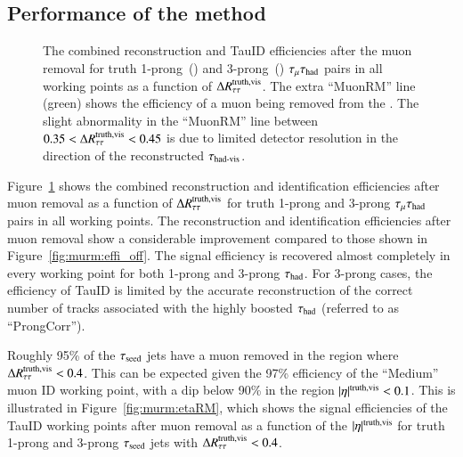     \subsection{Performance of the method} \label{sec:murm_perf}
        \begin{figure}[hbtp]
            \begin{center}
                \caption{The combined reconstruction and TauID efficiencies 
                    after the muon removal for truth 1-prong~(\protect{})
                    and 3-prong~(\protect{}) 
                    $\tau_\mathrm{\mu}\tau_\mathrm{had}$ pairs in all working points as a function of $\Delta R^\mathrm{truth, vis}_\mathrm{\tau\tau}$. 
                    The extra ``MuonRM'' line (green) shows the efficiency of a muon 
                    being removed from the \tauseed. The slight abnormality in the ``MuonRM'' line 
                    between $0.35 < \Delta R^\mathrm{truth, vis}_\mathrm{\tau\tau} < 0.45$ is due to limited detector 
                    resolution in the direction of the reconstructed $\tau_{\text{had-vis}}$.
                }
                \label{fig:murm:effi_new}
            \end{center}
        \end{figure}
        Figure~\ref{fig:murm:effi_new} shows the combined reconstruction and identification efficiencies after muon removal as a function of 
        $\Delta R^\mathrm{truth, vis}_\mathrm{\tau\tau}$ for truth 1-prong and 3-prong $\tau_\mathrm{\mu}\tau_\mathrm{had}$ pairs in all working points. 
        The reconstruction and identification efficiencies after muon removal show a considerable improvement compared to those shown 
        in Figure~\ref{fig:murm:effi_off}. The signal efficiency is recovered almost completely in every working point 
        for both 1-prong and 3-prong $\tau_{\text{had}}$. For 3-prong cases, the efficiency of TauID is limited by the 
        accurate reconstruction of the correct number of tracks associated with the highly boosted 
        $\tau_{\text{had}}$ (referred to as ``ProngCorr''). 


        Roughly 95\% of the $\tau_\mathrm{seed}$ jets have a muon removed in the region where $\Delta R^\mathrm{truth, vis}_\mathrm{\tau\tau} < 0.4$. 
        This can be expected given the 97\% efficiency of the ``Medium'' muon ID working point, 
        with a dip below 90\% in the region $|\eta|^\mathrm{truth,vis} < 0.1$. This is illustrated in 
        Figure~\ref{fig:murm:etaRM}, which shows the signal efficiencies of the TauID working points after muon removal as a 
        function of the $|\eta|^\mathrm{truth,vis}$ for truth 1-prong and 3-prong $\tau_\mathrm{seed}$ jets with 
        $\Delta R^\mathrm{truth, vis}_\mathrm{\tau\tau} < 0.4$. 

